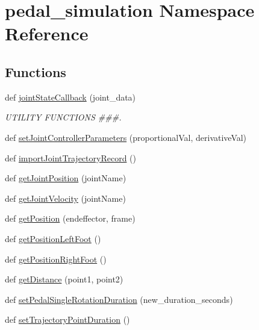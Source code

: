 \hypertarget{namespacepedal__simulation}{}\section{pedal\+\_\+simulation Namespace Reference}
\label{namespacepedal__simulation}
\subsection*{Functions}
\begin{DoxyCompactItemize}
\item 
def \mbox{\hyperlink{namespacepedal__simulation_a9410b0fd1bb79787c8581efa83364a49}{joint\+State\+Callback}} (joint\+\_\+data)
\begin{DoxyCompactList}\small\item\em U\+T\+I\+L\+I\+TY F\+U\+N\+C\+T\+I\+O\+NS \#\#\#. \end{DoxyCompactList}\item 
def \mbox{\hyperlink{namespacepedal__simulation_a5a971c07811066312d34f83f16eb4d99}{set\+Joint\+Controller\+Parameters}} (proportional\+Val, derivative\+Val)
\item 
def \mbox{\hyperlink{namespacepedal__simulation_aff64c4ebd701ea36fbee83eb632b57a7}{import\+Joint\+Trajectory\+Record}} ()
\item 
def \mbox{\hyperlink{namespacepedal__simulation_abb0ade1db3ccf525077ca1f2c59bc558}{get\+Joint\+Position}} (joint\+Name)
\item 
def \mbox{\hyperlink{namespacepedal__simulation_a0ee75e78af6b0ac572720f7d805c8627}{get\+Joint\+Velocity}} (joint\+Name)
\item 
def \mbox{\hyperlink{namespacepedal__simulation_a95f712bb817f4aa1a6c75e18db6fd705}{get\+Position}} (endeffector, frame)
\item 
def \mbox{\hyperlink{namespacepedal__simulation_ad388c8b092cbc564fdca15fbcbeeb0fe}{get\+Position\+Left\+Foot}} ()
\item 
def \mbox{\hyperlink{namespacepedal__simulation_a665cd2117a5d8902d25ca0ecc5cf5a6f}{get\+Position\+Right\+Foot}} ()
\item 
def \mbox{\hyperlink{namespacepedal__simulation_a84cf351a6c446cfb26f97b6c5aeaeb59}{get\+Distance}} (point1, point2)
\item 
def \mbox{\hyperlink{namespacepedal__simulation_a6b7af85f1db951c2eb0e86b1ab233610}{set\+Pedal\+Single\+Rotation\+Duration}} (new\+\_\+duration\+\_\+seconds)
\item 
def \mbox{\hyperlink{namespacepedal__simulation_af7572cfe2f9ff9c469bb6293e15185a5}{set\+Trajectory\+Point\+Duration}} ()

\end{DoxyCompactItemize}
